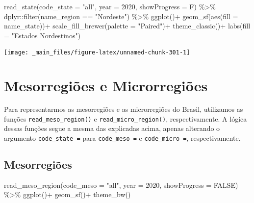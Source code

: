 \documentclass[
  brazilian,
]{book}
\newenvironment{Shaded}{\begin{snugshade}}{\end{snugshade}}
\newcommand{\AttributeTok}[1]{\textcolor[rgb]{0.77,0.63,0.00}{#1}}
\newcommand{\ConstantTok}[1]{\textcolor[rgb]{0.00,0.00,0.00}{#1}}
\newcommand{\DecValTok}[1]{\textcolor[rgb]{0.00,0.00,0.81}{#1}}
\newcommand{\FunctionTok}[1]{\textcolor[rgb]{0.00,0.00,0.00}{#1}}
\newcommand{\NormalTok}[1]{#1}
\newcommand{\SpecialCharTok}[1]{\textcolor[rgb]{0.00,0.00,0.00}{#1}}
\newcommand{\StringTok}[1]{\textcolor[rgb]{0.31,0.60,0.02}{#1}}
\begin{document}
\begin{Shaded}
\begin{Highlighting}[]
\FunctionTok{read\_state}\NormalTok{(}\AttributeTok{code\_state =} \StringTok{"all"}\NormalTok{,}
           \AttributeTok{year =} \DecValTok{2020}\NormalTok{,}
           \AttributeTok{showProgress =}\NormalTok{ F) }\SpecialCharTok{\%\textgreater{}\%} 
\NormalTok{  dplyr}\SpecialCharTok{::}\FunctionTok{filter}\NormalTok{(name\_region }\SpecialCharTok{==} \StringTok{"Nordeste"}\NormalTok{) }\SpecialCharTok{\%\textgreater{}\%}
  \FunctionTok{ggplot}\NormalTok{()}\SpecialCharTok{+}
  \FunctionTok{geom\_sf}\NormalTok{(}\FunctionTok{aes}\NormalTok{(}\AttributeTok{fill =}\NormalTok{ name\_state))}\SpecialCharTok{+}
  \FunctionTok{scale\_fill\_brewer}\NormalTok{(}\AttributeTok{palette =} \StringTok{"Paired"}\NormalTok{)}\SpecialCharTok{+}
  \FunctionTok{theme\_classic}\NormalTok{()}\SpecialCharTok{+}
  \FunctionTok{labs}\NormalTok{(}\AttributeTok{fill =} \StringTok{"Estados Nordestinos"}\NormalTok{)}
\end{Highlighting}
\end{Shaded}

\begin{center}\texttt{[image: \_main\_files/figure-latex/unnamed-chunk-301-1]} \end{center}

\hypertarget{mesorregiuxf5es-e-microrregiuxf5es}{%
\section{Mesorregiões e Microrregiões}\label{mesorregiuxf5es-e-microrregiuxf5es}}

Para representarmos as mesorregiões e as microrregiões do Brasil, utilizamos as funções \texttt{read\_meso\_region()} e \texttt{read\_micro\_region()}, respectivamente. A lógica dessas funções segue a mesma das explicadas acima, apenas alterando o argumento \texttt{code\_state\ =} para \texttt{code\_meso\ =} e \texttt{code\_micro\ =}, respectivamente.

\hypertarget{mesorregiuxf5es}{%
\subsection{Mesorregiões}\label{mesorregiuxf5es}}

\begin{Shaded}
\begin{Highlighting}[]
\FunctionTok{read\_meso\_region}\NormalTok{(}\AttributeTok{code\_meso =} \StringTok{"all"}\NormalTok{,}
                 \AttributeTok{year =} \DecValTok{2020}\NormalTok{,}
                 \AttributeTok{showProgress =} \ConstantTok{FALSE}\NormalTok{) }\SpecialCharTok{\%\textgreater{}\%}
  \FunctionTok{ggplot}\NormalTok{()}\SpecialCharTok{+}
  \FunctionTok{geom\_sf}\NormalTok{()}\SpecialCharTok{+}
  \FunctionTok{theme\_bw}\NormalTok{()}
\end{Highlighting}
\end{Shaded}
\end{document}
